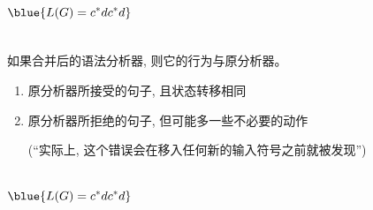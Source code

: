 \begin{frame}{}
  \begin{center}

    \begin{columns}

        \[
          \blue{L(G) = c^{\ast}dc^{\ast}d}
        \]
    \end{columns}

    \vspace{0.20cm}
  \end{center}
\end{frame}

\begin{frame}{}
  \begin{center}
    \begin{theorem}
      如果合并后的语法分析器, 则它的行为与原分析器。
    \end{theorem}

    \vspace{0.80cm}
    \begin{enumerate}[(1)]
      \setlength{\itemsep}{15pt}
      \item {}原分析器所接受的句子, 且状态转移相同
      \item {}原分析器所拒绝的句子, 但可能多一些不必要的动作

        \pause
        \vspace{0.50cm}
        (``实际上, 这个错误会在移入任何新的输入符号之前就被发现'')
    \end{enumerate}
  \end{center}
\end{frame}

\begin{frame}{}
  \begin{center}

    \begin{columns}

        \[
          \blue{L(G) = c^{\ast}dc^{\ast}d}
        \]
    \end{columns}

    \vspace{0.20cm}
  \end{center}
\end{frame}


